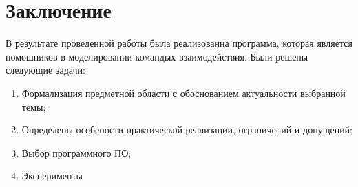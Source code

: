 \newpage
\section{Заключение}

	В результате проведенной работы была реализованна программа, которая является помошников в моделировании командых взаимодействия.
	Были решены следующие задачи:
	\begin{enumerate}
		\item Формализация предметной области с обоснованием актуальности выбранной темы;
		\item Определены особености практической реализации, ограничений и допущений;
		\item Выбор программного ПО;
		\item Эксперименты
	\end{enumerate}